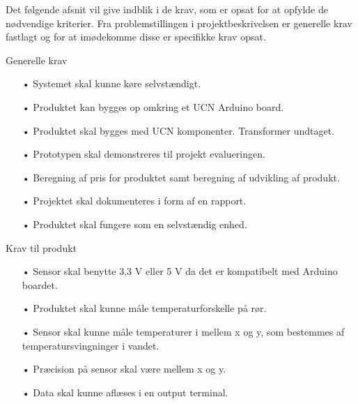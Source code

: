 Det følgende afsnit vil give indblik i de krav, som er opsat for at opfylde de nødvendige kriterier. Fra problemstillingen i projektbeskrivelsen er generelle krav fastlagt og for at imødekomme disse er specifikke krav opsat.  

\hfill \break
Generelle krav
\begin{enumerate}
	\item[•]Systemet skal kunne køre selvstændigt.
	\item[•]Produktet kan bygges op omkring et UCN Arduino board. 
	\item[•]Produktet skal bygges med UCN komponenter. Transformer undtaget.
	\item[•]Prototypen skal demonstreres til projekt evalueringen. 
	\item[•]Beregning af pris for produktet samt beregning af udvikling af       produkt.
	\item[•]Projektet skal dokumenteres i form af en rapport.
	\item[•]Produktet skal fungere som en selvstændig enhed.
\end{enumerate}	

Krav til produkt
\begin{enumerate}
	\item[•]Sensor skal benytte 3,3 V eller 5 V da det er kompatibelt med Arduino boardet.
	\item[•]Produktet skal kunne måle temperaturforskelle på rør.
	\item[•]Sensor skal kunne måle temperaturer i mellem x og y, som bestemmes af temperatursvingninger i vandet.
	\item[•]Præcision på sensor skal være mellem x og y.
	\item[•]Data skal kunne aflæses i en output terminal.
\end{enumerate}	
	